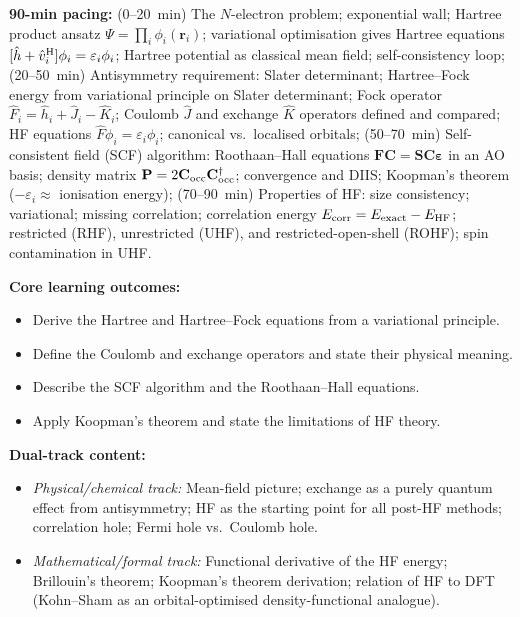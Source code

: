 \documentclass[11pt,a4paper]{article}
\begin{document}
\begin{tcolorbox}[modulebox, title={Module~II.1 --- Lecture L03: Hartree and Hartree--Fock Theory}]
\textbf{90-min pacing:} (0--20~min) The $N$-electron problem; exponential wall;
Hartree product ansatz $\Psi=\prod_i\phi_i(\mathbf{r}_i)$; variational optimisation
gives Hartree equations $[\hat{h}+\hat{v}^{\rm H}_i]\phi_i=\varepsilon_i\phi_i$;
Hartree potential as classical mean field; self-consistency loop;
(20--50~min) Antisymmetry requirement: Slater determinant;
Hartree--Fock energy from variational principle on Slater determinant;
Fock operator $\hat{F}_i=\hat{h}_i+\hat{J}_i-\hat{K}_i$;
Coulomb $\hat{J}$ and exchange $\hat{K}$ operators defined and compared;
HF equations $\hat{F}\phi_i=\varepsilon_i\phi_i$;
canonical vs.\ localised orbitals;
(50--70~min) Self-consistent field (SCF) algorithm: Roothaan--Hall equations
$\mathbf{F}\mathbf{C}=\mathbf{S}\mathbf{C}\boldsymbol{\varepsilon}$ in an AO basis;
density matrix $\mathbf{P}=2\mathbf{C}_{\rm occ}\mathbf{C}_{\rm occ}^\dagger$;
convergence and DIIS; Koopman's theorem ($-\varepsilon_i \approx$ ionisation energy);
(70--90~min) Properties of HF: size consistency; variational; missing correlation;
correlation energy $E_{\rm corr}=E_{\rm exact}-E_{\rm HF}$;
restricted (RHF), unrestricted (UHF), and restricted-open-shell (ROHF);
spin contamination in UHF.

\medskip\textbf{Core learning outcomes:}
\begin{itemize}[leftmargin=1.4em,topsep=2pt,itemsep=1pt]
  \item Derive the Hartree and Hartree--Fock equations from a variational principle.
  \item Define the Coulomb and exchange operators and state their physical meaning.
  \item Describe the SCF algorithm and the Roothaan--Hall equations.
  \item Apply Koopman's theorem and state the limitations of HF theory.
\end{itemize}

\medskip\textbf{Dual-track content:}
\begin{itemize}[leftmargin=1.4em,topsep=2pt,itemsep=1pt]
  \item \textit{Physical/chemical track:} Mean-field picture; exchange as a purely quantum
    effect from antisymmetry; HF as the starting point for all post-HF methods;
    correlation hole; Fermi hole vs.\ Coulomb hole.
  \item \textit{Mathematical/formal track:} Functional derivative of the HF energy;
    Brillouin's theorem; Koopman's theorem derivation; relation of HF to DFT
    (Kohn--Sham as an orbital-optimised density-functional analogue).
\end{itemize}


\end{tcolorbox}
\end{document}
